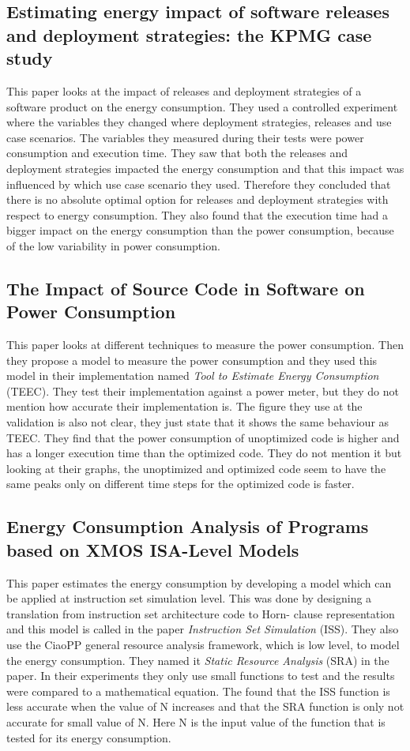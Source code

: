 \subsection{Estimating energy impact of software releases and deployment strategies: the KPMG case study \cite{verdecchia2017estimating}}
This paper looks at the impact of releases and deployment strategies of a software product on the energy consumption. They used a controlled experiment where the variables they changed where deployment strategies, releases and use case scenarios. The variables they measured during their tests were power consumption and execution time. They saw that both the releases and deployment strategies impacted the energy consumption and that this impact was influenced by which use case scenario they used. Therefore they concluded that there is no absolute optimal option for releases and deployment strategies with respect to energy consumption. They also found that the execution time had a bigger impact on the energy consumption than the power consumption, because of the low variability in power consumption.

\subsection{The Impact of Source Code in Software on Power Consumption \cite{acar2016impact}}
This paper looks at different techniques to measure the power consumption. Then they propose a model to measure the power consumption and they used this model in their implementation named \textit{Tool to Estimate Energy Consumption} (TEEC). They test their implementation against a power meter, but they do not mention how accurate their implementation is. The figure they use at the validation is also not clear, they just state that it shows the same behaviour as TEEC. They find that the power consumption of unoptimized code is higher and has a longer execution time than the optimized code. They do not mention it but looking at their graphs, the unoptimized and optimized code seem to have the same peaks only on different time steps for the optimized code is faster.

\subsection{Energy Consumption Analysis of Programs based on XMOS ISA-Level Models \cite{liqat2013energy}}
This paper estimates the energy consumption by developing a model which can be applied at instruction set simulation level. This was done by designing a translation from instruction set architecture code to Horn- clause representation and this model is called in the paper \textit{Instruction Set Simulation} (ISS). They also use the CiaoPP general resource analysis framework, which is low level, to model the energy consumption. They named it \textit{Static Resource Analysis} (SRA) in the paper. In their experiments they only use small functions to test and the results were compared to a mathematical equation. The found that the ISS function is less accurate when the value of N increases and that the SRA function is only not accurate for small value of N. Here N is the input value of the function that is tested for its energy consumption.

